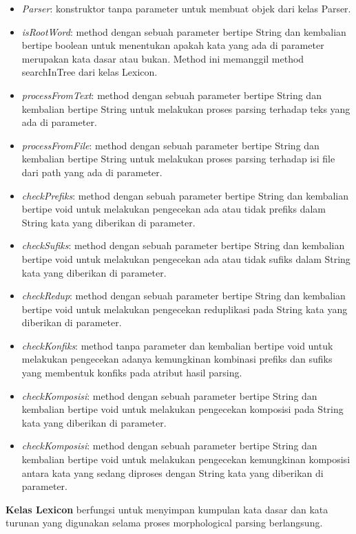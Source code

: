 \begin{itemize}
	\item \textit{Parser}: konstruktor tanpa parameter untuk membuat objek dari kelas Parser.
	\item \textit{isRootWord}: method dengan sebuah parameter bertipe String dan kembalian bertipe boolean untuk menentukan apakah kata yang ada di parameter merupakan kata dasar atau bukan. Method ini memanggil method searchInTree dari kelas Lexicon.
	\item \textit{processFromText}: method dengan sebuah parameter bertipe String dan kembalian bertipe String untuk melakukan proses parsing terhadap teks yang ada di parameter.
	\item \textit{processFromFile}: method dengan sebuah parameter bertipe String dan kembalian bertipe String untuk melakukan proses parsing terhadap isi file dari path yang ada di parameter.
	\item \textit{checkPrefiks}: method dengan sebuah parameter bertipe String dan kembalian bertipe void untuk melakukan pengecekan ada atau tidak prefiks dalam String kata yang diberikan di parameter.
	\item \textit{checkSufiks}: method dengan sebuah parameter bertipe String dan kembalian bertipe void untuk melakukan pengecekan ada atau tidak sufiks dalam String kata yang diberikan di parameter.
	\item \textit{checkRedup}: method dengan sebuah parameter bertipe String dan kembalian bertipe void untuk melakukan pengecekan reduplikasi pada String kata yang diberikan di parameter.
	\item \textit{checkKonfiks}: method tanpa parameter dan kembalian bertipe void untuk melakukan pengecekan adanya kemungkinan kombinasi prefiks dan sufiks yang membentuk konfiks pada atribut hasil parsing.
	\item \textit{checkKomposisi}: method dengan sebuah parameter bertipe String dan kembalian bertipe void untuk melakukan pengecekan komposisi pada String kata yang diberikan di parameter.
	\item \textit{checkKomposisi}: method dengan sebuah parameter bertipe String dan kembalian bertipe void untuk melakukan pengecekan kemungkinan komposisi antara kata yang sedang diproses dengan String kata yang diberikan di parameter.
\end{itemize}

\textbf{Kelas Lexicon} berfungsi untuk menyimpan kumpulan kata dasar dan kata turunan yang digunakan selama proses morphological parsing berlangsung.

